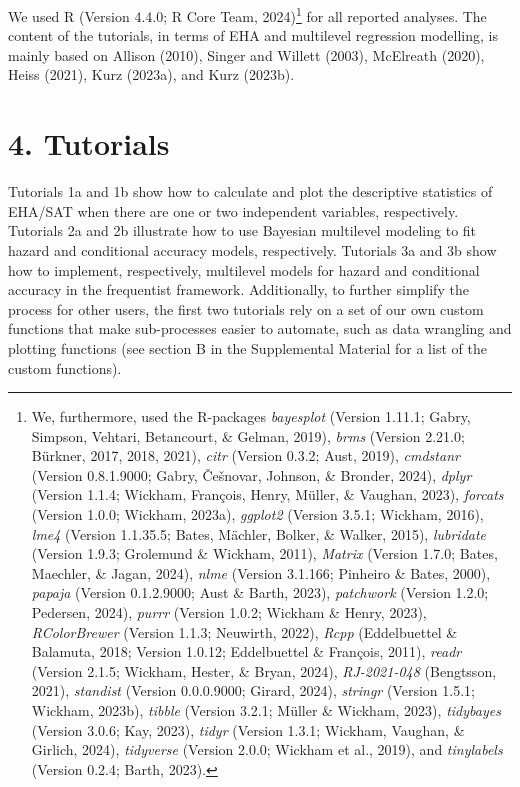 \documentclass[
  man, donotrepeattitle,floatsintext]{apa6}
\begin{document}
We used R (Version 4.4.0; R Core Team, 2024)\footnote{We, furthermore, used the R-packages \emph{bayesplot} (Version 1.11.1; Gabry, Simpson, Vehtari, Betancourt, \& Gelman, 2019), \emph{brms} (Version 2.21.0; Bürkner, 2017, 2018, 2021), \emph{citr} (Version 0.3.2; Aust, 2019), \emph{cmdstanr} (Version 0.8.1.9000; Gabry, Češnovar, Johnson, \& Bronder, 2024), \emph{dplyr} (Version 1.1.4; Wickham, François, Henry, Müller, \& Vaughan, 2023), \emph{forcats} (Version 1.0.0; Wickham, 2023a), \emph{ggplot2} (Version 3.5.1; Wickham, 2016), \emph{lme4} (Version 1.1.35.5; Bates, Mächler, Bolker, \& Walker, 2015), \emph{lubridate} (Version 1.9.3; Grolemund \& Wickham, 2011), \emph{Matrix} (Version 1.7.0; Bates, Maechler, \& Jagan, 2024), \emph{nlme} (Version 3.1.166; Pinheiro \& Bates, 2000), \emph{papaja} (Version 0.1.2.9000; Aust \& Barth, 2023), \emph{patchwork} (Version 1.2.0; Pedersen, 2024), \emph{purrr} (Version 1.0.2; Wickham \& Henry, 2023), \emph{RColorBrewer} (Version 1.1.3; Neuwirth, 2022), \emph{Rcpp} (Eddelbuettel \& Balamuta, 2018; Version 1.0.12; Eddelbuettel \& François, 2011), \emph{readr} (Version 2.1.5; Wickham, Hester, \& Bryan, 2024), \emph{RJ-2021-048} (Bengtsson, 2021), \emph{standist} (Version 0.0.0.9000; Girard, 2024), \emph{stringr} (Version 1.5.1; Wickham, 2023b), \emph{tibble} (Version 3.2.1; Müller \& Wickham, 2023), \emph{tidybayes} (Version 3.0.6; Kay, 2023), \emph{tidyr} (Version 1.3.1; Wickham, Vaughan, \& Girlich, 2024), \emph{tidyverse} (Version 2.0.0; Wickham et al., 2019), and \emph{tinylabels} (Version 0.2.4; Barth, 2023).} for all reported analyses. The content of the tutorials, in terms of EHA and multilevel regression modelling, is mainly based on Allison (2010), Singer and Willett (2003), McElreath (2020), Heiss (2021), Kurz (2023a), and Kurz (2023b).

\section{4. Tutorials}\label{tutorials}

Tutorials 1a and 1b show how to calculate and plot the descriptive statistics of EHA/SAT when there are one or two independent variables, respectively. Tutorials 2a and 2b illustrate how to use Bayesian multilevel modeling to fit hazard and conditional accuracy models, respectively. Tutorials 3a and 3b show how to implement, respectively, multilevel models for hazard and conditional accuracy in the frequentist framework.
Additionally, to further simplify the process for other users, the first two tutorials rely on a set of our own custom functions that make sub-processes easier to automate, such as data wrangling and plotting functions (see section B in the Supplemental Material for a list of the custom functions).
\end{document}
